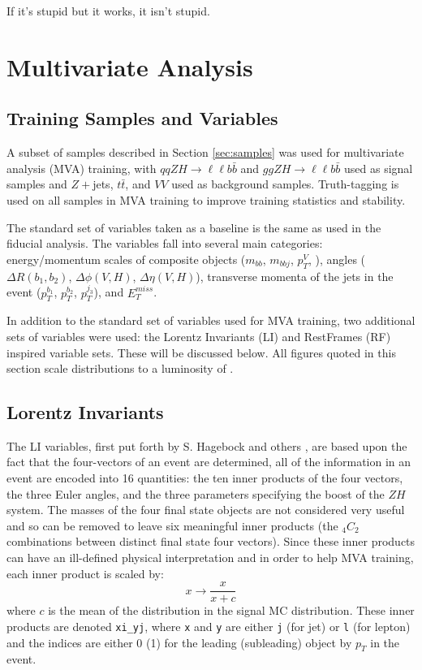 \begin{savequote}[75mm]
If it's stupid but it works, it isn't stupid.
\end{savequote}

\chapter{Multivariate Analysis}

\section{Training Samples and Variables}
A subset of samples described in Section \ref{sec:samples} was used for multivariate analysis (MVA) training, with $qqZH\to\ell\ell b\bar{b}$ and $ggZH\to\ell\ell b\bar{b}$ used as signal samples and $Z+$jets, $t\bar{t}$, and $VV$ used as background samples.  Truth-tagging is used on all samples in MVA training to improve training statistics and stability.

The standard set of variables taken as a baseline is the same as used in the fiducial analysis.  The variables fall into several main categories: energy/momentum scales of composite objects ($m_{bb}$, $m_{bbj}$, $p_T^V$, \mll), angles ($\Delta R\left(b_1,b_2\right)$, $\Delta\phi\left(V,H\right)$, $\Delta\eta\left(V,H\right)$), transverse momenta of the jets in the event ($p_T^{b_1}$, $p_T^{b_2}$, $p_T^{j_3}$), and $E_T^{miss}$.  

In addition to the standard set of variables used for MVA training, two additional sets of variables were used: the Lorentz Invariants (LI) and RestFrames (RF) inspired variable sets.  These will be discussed below.  All figures quoted in this section scale distributions to a luminosity of \LUMI.

\section{Lorentz Invariants}
  The LI variables, first put forth by S. Hagebock and others \cite{litalk}, are based upon the fact that the four-vectors of an event are determined, all of the information in an event are encoded into 16 quantities: the ten inner products of the four vectors, the three Euler angles, and the three parameters specifying the boost of the $ZH$ system.  The masses of the four final state objects are not considered very useful and so can be removed to leave six meaningful inner products (the $_4C_2$ combinations between distinct final state four vectors).  Since these inner products can have an ill-defined physical interpretation and in order to help MVA training, each inner product is scaled by:
\begin{equation}
\label{eqn:liip}
x\to\frac{x}{x+c}
\end{equation}
where $c$ is the mean of the distribution in the signal MC distribution.  These inner products are denoted \texttt{xi\_yj}, where \texttt{x} and \texttt{y} are either \texttt{j} (for jet) or \texttt{l} (for lepton) and the indices are either 0 (1) for the leading (subleading) object by $p_T$ in the event.

